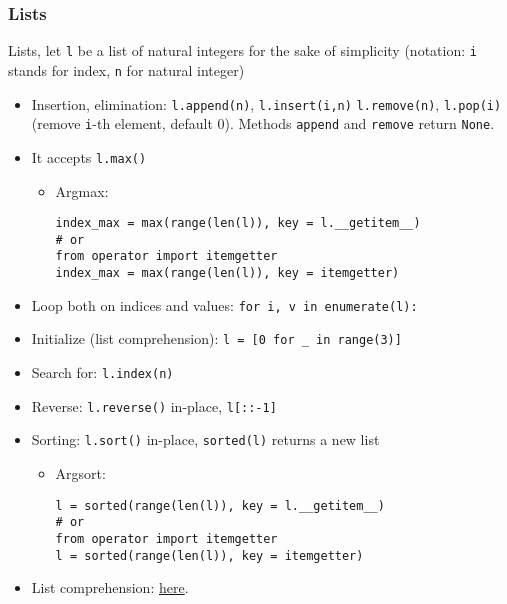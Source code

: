\documentclass[a4paper,12pt,%
              final%
              ]{article}
\begin{document}
\subsubsection{Lists}
Lists, let \verb|l| be a list of natural integers for the sake of simplicity (notation: \verb|i| stands for index, \verb|n| for natural integer)
\begin{itemize}
  \item Insertion, elimination: \verb|l.append(n)|, \verb|l.insert(i,n)| \verb|l.remove(n)|, \verb|l.pop(i)| (remove \texttt{i}-th element, default 0). Methods \texttt{append} and \texttt{remove} return \texttt{None}.
  \item It accepts \verb|l.max()|
    \begin{itemize}
      \item Argmax:
\begin{verbatim}
index_max = max(range(len(l)), key = l.__getitem__)
# or
from operator import itemgetter
index_max = max(range(len(l)), key = itemgetter)
\end{verbatim}
    \end{itemize}
  \item Loop both on indices and values: \verb|for i, v in enumerate(l):|
  \item Initialize (list comprehension): \verb|l = [0 for _ in range(3)]|
  \item Search for: \verb|l.index(n)|
  \item Reverse: \verb|l.reverse()| in-place, \verb|l[::-1]|
  \item Sorting: \verb|l.sort()| in-place, \verb|sorted(l)| returns a new list
    \begin{itemize}
      \item Argsort:
\begin{verbatim}
l = sorted(range(len(l)), key = l.__getitem__)
# or
from operator import itemgetter
l = sorted(range(len(l)), key = itemgetter)
\end{verbatim}
    \end{itemize}
  \item List comprehension: \href{https://www.programiz.com/python-programming/list-comprehension}{here}.
\end{itemize}
\end{document}
